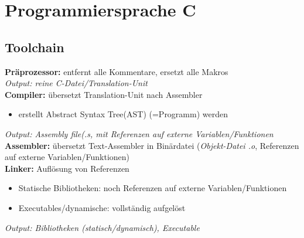 \section{Programmiersprache C}
\subsection{Toolchain}
\textbf{Präprozessor: }entfernt alle Kommentare, ersetzt alle Makros\\
\textit{Output: reine C-Datei/Translation-Unit}\\
\textbf{Compiler: }übersetzt Translation-Unit nach Assembler
\begin{itemize}[noitemsep]
\item erstellt Abstract Syntax Tree(AST) (=Programm)
werden
\end{itemize}
\textit{Output: Assembly file(.s, mit Referenzen auf externe Variablen/Funktionen}\\
\textbf{Assembler: }übersetzt Text-Assembler in Binärdatei (\textit{Objekt-Datei .o}, Referenzen auf externe Variablen/Funktionen)\\
\textbf{Linker: }Auflösung von Referenzen
\begin{itemize}
\item Statische Bibliotheken: noch Referenzen auf externe Variablen/Funktionen
\item Executables/dynamische: vollständig aufgelöst
\end{itemize}
\textit{Output: Bibliotheken (statisch/dynamisch), Executable}

